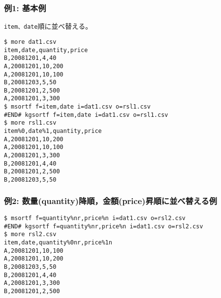 \subsubsection*{例1: 基本例}

\verb|item、date|順に並べ替える。


\begin{Verbatim}[baselinestretch=0.7,frame=single]
$ more dat1.csv
item,date,quantity,price
B,20081201,4,40
A,20081201,10,200
A,20081201,10,100
B,20081203,5,50
B,20081201,2,500
A,20081201,3,300
$ msortf f=item,date i=dat1.csv o=rsl1.csv
#END# kgsortf f=item,date i=dat1.csv o=rsl1.csv
$ more rsl1.csv
item%0,date%1,quantity,price
A,20081201,10,200
A,20081201,10,100
A,20081201,3,300
B,20081201,4,40
B,20081201,2,500
B,20081203,5,50
\end{Verbatim}
\subsubsection*{例2: 数量(quantity)降順，金額(price)昇順に並べ替える例}



\begin{Verbatim}[baselinestretch=0.7,frame=single]
$ msortf f=quantity%nr,price%n i=dat1.csv o=rsl2.csv
#END# kgsortf f=quantity%nr,price%n i=dat1.csv o=rsl2.csv
$ more rsl2.csv
item,date,quantity%0nr,price%1n
A,20081201,10,100
A,20081201,10,200
B,20081203,5,50
B,20081201,4,40
A,20081201,3,300
B,20081201,2,500
\end{Verbatim}
